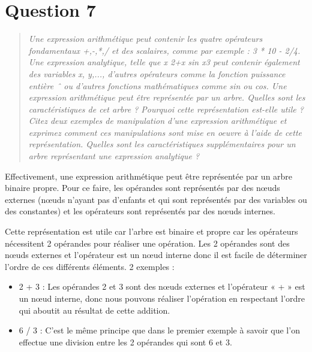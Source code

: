 \documentclass[11pt,a4paper]{article}
\begin{document}








\section{Question 7}
\begin{quotation}
\color{gray}\textit{Une expression arithmétique peut contenir les quatre opérateurs fondamentaux
+,-,*,/ et des scalaires, comme par exemple : 3 * 10 - 2/4. Une expression
analytique, telle que x
2+x sin x3 peut contenir également des variables x, y,...,
d’autres opérateurs comme la fonction puissance entière ˆ ou d’autres fonctions
mathématiques comme sin ou cos.
Une expression arithmétique peut être représentée par un arbre. Quelles sont les
caractéristiques de cet arbre ? Pourquoi cette représentation est-elle utile ? Citez
deux exemples de manipulation d’une expression arithmétique et exprimez comment ces manipulations sont mise en oeuvre à l’aide de cette représentation.
Quelles sont les caractéristiques supplémentaires pour un arbre représentant une
expression analytique ?}
\end{quotation}

Effectivement, une expression arithmétique peut être représentée par un arbre binaire propre. Pour ce faire, les opérandes sont représentés par des nœuds externes (nœuds n’ayant pas d’enfants et qui sont représentés par des variables ou des constantes) et les opérateurs sont représentés par des nœuds internes.

Cette représentation est utile car l’arbre est binaire et propre car les opérateurs nécessitent  2 opérandes pour réaliser une opération. Les 2 opérandes sont des nœuds externes  et l’opérateur est un nœud interne donc il est facile de déterminer l’ordre de ces différents éléments. 2 exemples :

\begin{itemize}
\item 2 + 3 : Les opérandes 2 et 3 sont des nœuds externes et l’opérateur « + » est un nœud interne, donc nous pouvons réaliser l’opération en respectant l’ordre qui aboutit au résultat de cette addition.

\item 6 / 3 : C’est le même principe que dans le premier exemple à savoir que l’on effectue une division entre les 2 opérandes qui sont 6 et 3. 
\end{itemize}
\end{document}
